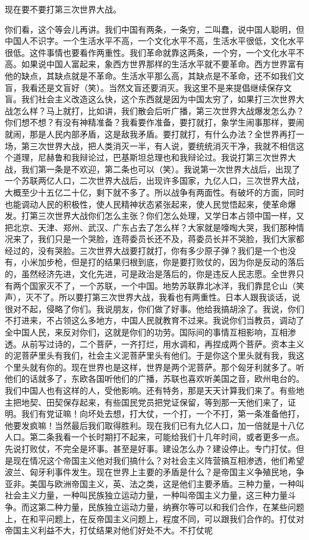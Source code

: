 现在要不要打第三次世界大战。

你们看，这个等会儿再讲。我们中国有两条，一条穷，二叫蠢，说中国人聪明，但中国人不识字。一个生活水平不高，一个文化水平不高，生活水平很低，文化水平很低。这件事情也要看作两重性。我们革命就靠这两条，一个穷，一个文化水平不高。如果说中国人富起来，象西方世界那样的生活水平就不要革命。西方世界富有他的缺点，其缺点就是不革命。生活水平那么高，其缺点是不革命，还不如我们文盲，我看还是文盲好（笑）。当然文盲还要消灭。我这里不是来提倡继续保存文盲。我们社会主义改造这么快，这个东西就是因为中国太穷了，如果打三次世界大战怎么样？马上就打，比如讲，我们散会后听广播，第三次世界大战爆发怎么办？你们想不想？有没有神精准备？我看要作准备，要打就打，象学生闹事那样，要闹就闹，那是人民内部矛盾，这是敌我矛盾。要打就打，有什么办法？全世界再打一场，第三次世界大战，把人类消灭一半，有人说，要统统消灭干净，我就不相信这个道理，尼赫鲁和我辩论过，巴基斯坦总理也和我辩论过。我说打第三次世界大战，我们第一条是不欢迎，第二条也可以（笑）。我说第一次世界大战后，出现了一个苏联两亿人口，二次世界大战后，出现许多国家，九亿人口，三次世界大战，大概至少十五亿二十亿，剩下就不多了。所以战争有两面性。有破坏的方面，同时也能调动人民的积极性，使人民精神状态紧张起来，使人民觉悟起来，使革命爆发。打第三次世界大战你们怎么主张？你们怎么处理，又学日本占领中国一样，又把北京、天津、郑州、武汉、广东占去了怎么样？大家就是嚎啕大哭，我们那种情况来了，我们只是一个哭脸，连蒋委员长还不及，蒋委员长并不哭脸，我们大家都经过的，没有哭脸。三次世界大战要打就打，你有多少原子弹？我们是一个也没有，小米加步枪，但是打的结果归根到底，你是要打败仗的，因为你是反动的落后的，虽然经济先进，文化先进，可是政治是落后的，你是违反人民志愿。全世界只有两个国家灭不了，一个苏联，一个中国。地势苏联靠北冰洋，我们靠昆仑山（笑声），灭不了。所以要打第三次世界大战，我看也有两重性。日本人跟我谈话，说很对不起，侵略了你们。我说朋友，你们做了好事。他给我搞胡涂了。我说，你们不打进来，不占领这么多地方，中国人民就教育不过来。我说你们当教员，调动了全中国人民，来反对你们，这就是你们的功劳。国际间的事情互相影响，互相渗透。从前写过诗的，二个菩萨，一齐打烂，用水调和，再捏成两个菩萨。资本主义的泥菩萨里头有我们，社会主义泥菩萨里头有他们。于是你这个里头就有我，我这个里头就有你的。现在世界也是这样，世界是两个泥菩萨。那个匈牙利就多了。听他们的话就多了，东欧各国听他们的广播，苏联也喜欢听美国之音，欧州电台的。我们中国人也有这样的人，受他影响。还有特务，那是天天计算我们来了。有些地主把地契、田契保存起来，有些国民党员把党证保留，等到那一天他们来了，证明。我们有党证嘛！向坏处去想，打大仗，一个打，一个不打，第一条准备他打，他要发疯嘛！当然最后我们取得胜利。现在我们已有九亿人口，加一倍就是十八亿人口。第二条我看一个长时期打不起来，可能给我们十几年时间，或者更多一点。先说打败仗，不完全是坏事。甚至是好事。建设怎么办？建设停止。专门打仗。但是现在情况这个帝国主义他对我们搞什么？对社会主义阵营搞互相渗透，他们希望波兰、匈牙利事件发生。现在世界上主要的矛盾是什么？是帝国主义争殖民地，争亚非。美国与欧洲帝国主义，英、法之类，这是他们主要矛盾。三种力量，一种叫社会主义力量，一种叫民族独立运动力量，一种叫帝国主义力量，这三种力量斗争。而这第二种力量，民族独立运动力量，纳赛尔等可以和我们合作，在某些问题上，在和平问题上，在反帝国主义问题上，程度不同，可以跟我们合作的。打仗对帝国主义利益不大，打仗结果对他们好处不大。不打仗呢